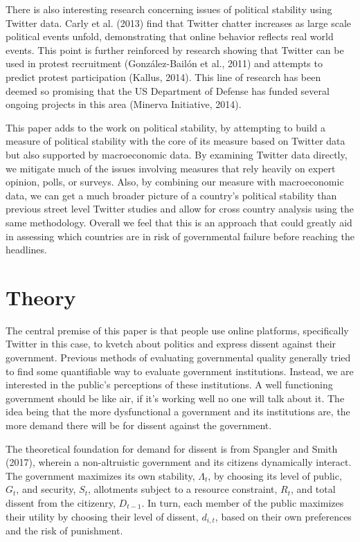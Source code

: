 \documentclass[12pt]{article}
\begin{document}
\begin{spacing}{1.5}
There is also interesting research concerning issues of political stability using Twitter data. Carly et al. (2013) find that Twitter chatter increases as large scale political events unfold, demonstrating that online behavior reflects real world events. This point is further reinforced by research showing that Twitter can be used in protest recruitment (Gonz{\'a}lez-Bail{\'o}n et al., 2011) and attempts to predict protest participation (Kallus, 2014). This line of research has been deemed so promising that the US Department of Defense has funded several ongoing projects in this area (Minerva Initiative, 2014).  

This paper adds to the work on political stability, by attempting to build a measure of political stability with the core of its measure based on Twitter data but also supported by macroeconomic data. By examining Twitter data directly, we mitigate much of the issues involving measures that rely heavily on expert opinion, polls, or surveys. Also, by combining our measure with macroeconomic data, we can get a much broader picture of a country's political stability than previous street level Twitter studies and allow for cross country analysis using the same methodology. Overall we feel that this is an approach that could greatly aid in assessing which countries are in risk of governmental failure before reaching the headlines.      

\section*{Theory}


The central premise of this paper is that people use online platforms, specifically Twitter in this case, to kvetch about politics and express dissent against their government. Previous methods of evaluating governmental quality generally tried to find some quantifiable way to evaluate government institutions. Instead, we are interested in the public's perceptions of these institutions. A well functioning government should be like air, if it's working well no one will talk about it. The idea being that the more dysfunctional a government and its institutions are, the more demand there will be for dissent against the government.

The theoretical foundation for demand for dissent is from Spangler and Smith (2017), wherein a non-altruistic government and its citizens dynamically interact. The government maximizes its own stability, $\Lambda_t$, by choosing its level of public, $G_t$, and security, $S_t$, allotments subject to a resource constraint, $R_t$, and total dissent from the citizenry, $D_{t-1}$. In turn, each member of the public maximizes their utility by choosing their level of dissent, $d_{i,t}$, based on their own preferences and the risk of punishment. 


\end{spacing}
\end{document}
